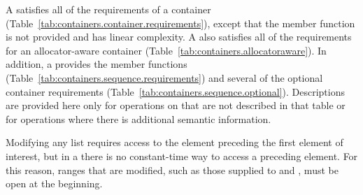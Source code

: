 \pnum
A  satisfies all of the requirements of a container
(Table~\ref{tab:containers.container.requirements}), except that the 
member function is not provided and  has linear complexity.
A  also satisfies all of the requirements for an allocator-aware
container (Table~\ref{tab:containers.allocatoraware}). In addition, a 
provides the  member functions
(Table~\ref{tab:containers.sequence.requirements}) and several of the optional
container requirements (Table~\ref{tab:containers.sequence.optional}).
Descriptions are provided here only for operations on
 that are not described in that table or for operations where there
is additional semantic information.

\pnum
\begin{note} Modifying any list requires access to the element preceding the first element
of interest, but in a  there is no constant-time way to access a
preceding element. For this reason, ranges that are modified, such as those supplied to
 and , must be open at the beginning. \end{note}

